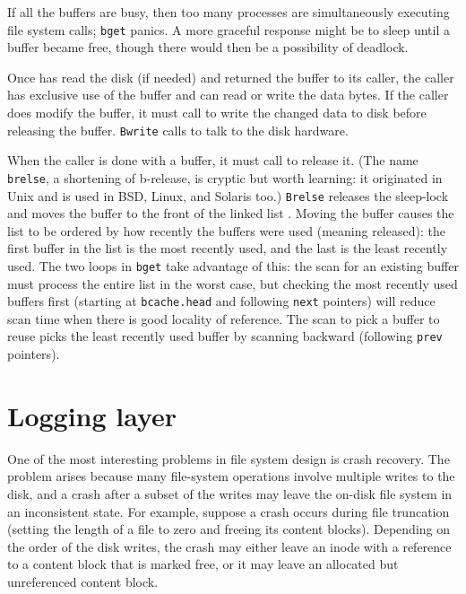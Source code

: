 If all the buffers are busy, then too many processes are
simultaneously executing file system calls;
\lstinline{bget}
panics.
A more graceful response might be to sleep until a buffer became free,
though there would then be a possibility of deadlock.

Once
has read the disk (if needed) and returned the
buffer to its caller, the caller has
exclusive use of the buffer and can read or write the data bytes.
If the caller does modify the buffer, it must call
to write the changed data to disk before releasing the buffer.
\lstinline{Bwrite}
calls
to talk to the disk hardware.

When the caller is done with a buffer,
it must call
to release it. 
(The name
\lstinline{brelse},
a shortening of
b-release,
is cryptic but worth learning:
it originated in Unix and is used in BSD, Linux, and Solaris too.)
\lstinline{Brelse}
releases the sleep-lock and
moves the buffer
to the front of the linked list
.
Moving the buffer causes the
list to be ordered by how recently the buffers were used (meaning released):
the first buffer in the list is the most recently used,
and the last is the least recently used.
The two loops in
\lstinline{bget}
take advantage of this:
the scan for an existing buffer must process the entire list
in the worst case, but checking the most recently used buffers
first (starting at
\lstinline{bcache.head}
and following
\lstinline{next}
pointers) will reduce scan time when there is good locality of reference.
The scan to pick a buffer to reuse picks the least recently used
buffer by scanning backward
(following 
\lstinline{prev}
pointers).
\section{Logging layer}

One of the most interesting problems in file system design is crash
recovery. The problem arises because many file-system operations
involve multiple writes to the disk, and a crash after a subset of the
writes may leave the on-disk file system in an inconsistent state. For
example, suppose a crash occurs during file truncation (setting
the length of a file to zero and freeing its content blocks).
Depending on the order of the disk writes, the crash 
may either leave an inode with a reference
to a content block that is marked free,
or it may leave an allocated but unreferenced content block.

